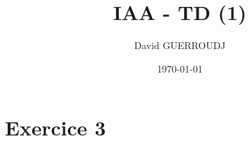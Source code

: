 \documentclass{article}
\title{IAA - TD (1)}
\author{David GUERROUDJ}
\date{\today}
\begin{document}
\maketitle %

\tableofcontents %
\vfill\eject

\section{Exercice 3}
\end{document}
